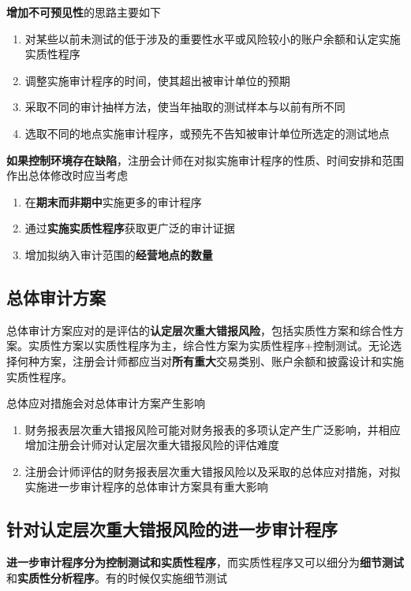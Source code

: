 \documentclass[UTF8,12pt]{ctexart}
\numberwithin{equation}{section} %
\numberwithin{figure}{section}
\numberwithin{table}{section}
\begin{document}
	\textbf{增加不可预见性}的思路主要如下
	\begin{enumerate}
		\item 对某些以前未测试的低于涉及的重要性水平或风险较小的账户余额和认定实施实质性程序
		
		\item 调整实施审计程序的时间，使其超出被审计单位的预期
		
		\item 采取不同的审计抽样方法，使当年抽取的测试样本与以前有所不同
		
		\item 选取不同的地点实施审计程序，或预先不告知被审计单位所选定的测试地点
	\end{enumerate}
	
	\textbf{如果控制环境存在缺陷}，注册会计师在对拟实施审计程序的性质、时间安排和范围作出总体修改时应当考虑
	\begin{enumerate}
		\item 在\textbf{期末而非期中}实施更多的审计程序
		
		\item 通过\textbf{实施实质性程序}获取更广泛的审计证据
		
		\item 增加拟纳入审计范围的\textbf{经营地点的数量}
	\end{enumerate}
	
	\subsection{总体审计方案}
	总体审计方案应对的是评估的\textbf{认定层次重大错报风险}，包括实质性方案和综合性方案。实质性方案以实质性程序为主，综合性方案为实质性程序+控制测试。无论选择何种方案，注册会计师都应当对\textbf{所有重大}交易类别、账户余额和披露设计和实施实质性程序。
	
	总体应对措施会对总体审计方案产生影响
	\begin{enumerate}
		\item 财务报表层次重大错报风险可能对财务报表的多项认定产生广泛影响，并相应增加注册会计师对认定层次重大错报风险的评估难度
		
		\item 注册会计师评估的财务报表层次重大错报风险以及采取的总体应对措施，对拟实施进一步审计程序的总体审计方案具有重大影响
	\end{enumerate}
	
	\subsection{针对认定层次重大错报风险的进一步审计程序}
	\textbf{进一步审计程序分为控制测试和实质性程序}，而实质性程序又可以细分为\textbf{细节测试}和\textbf{实质性分析程序}。有的时候仅实施细节测试
	
\end{document}
